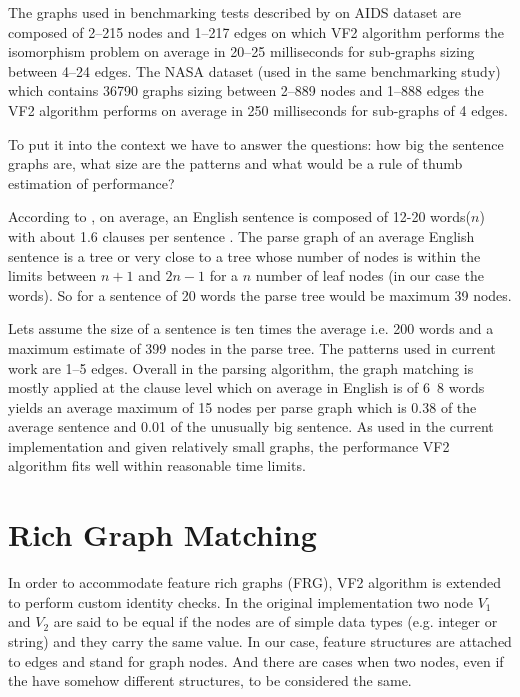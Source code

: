 The graphs used in benchmarking tests described by \citep{Lee2013} on AIDS dataset are composed of 2--215 nodes and 1--217 edges on which VF2 algorithm performs the isomorphism problem on average in 20--25 milliseconds for sub-graphs sizing between 4--24 edges. The NASA dataset (used in the same benchmarking study) which contains 36790 graphs sizing between 2--889 nodes and 1--888 edges the VF2 algorithm performs on average in 250 milliseconds for sub-graphs of 4 edges.

To put it into the context we have to answer the questions: how big the sentence graphs are, what size are the patterns and what would be a rule of thumb estimation of performance?
 
According to \citep{Koeva2012}, on average, an English sentence is composed of 12-20 words($n$) with about 1.6 clauses per sentence . %
The parse graph of an average English sentence is a tree or very close to a tree whose number of nodes is within the limits between $n+1$ and $2n-1$ for a $n$ number of leaf nodes (in our case the words). So for a sentence of 20 words the parse tree would be maximum 39 nodes.

Lets assume the size of a sentence is ten times the average i.e. 200 words and a maximum estimate of 399 nodes in the parse tree. The patterns used in current work are 1--5 edges. Overall in the parsing algorithm, the graph matching is mostly applied at the clause level which on average in English is of 6~8 words yields an average maximum of 15 nodes per parse graph which is 0.38 of the average sentence and 0.01 of the unusually big sentence.
As used in the current implementation and given relatively small graphs, the performance VF2 algorithm fits well within reasonable time limits.

\section{Rich Graph Matching}
\label{sec:rich-graph-matching}
In order to accommodate feature rich graphs (FRG), VF2 algorithm is extended to perform custom identity checks. In the original implementation two node $V_{1}$ and $V_{2}$ are said to be equal if the nodes are of simple data types (e.g. integer or string) and they carry the same value. In our case, feature structures are attached to edges and stand for graph nodes. And there are cases when two nodes, even if the have somehow different structures, to be considered the same. 

